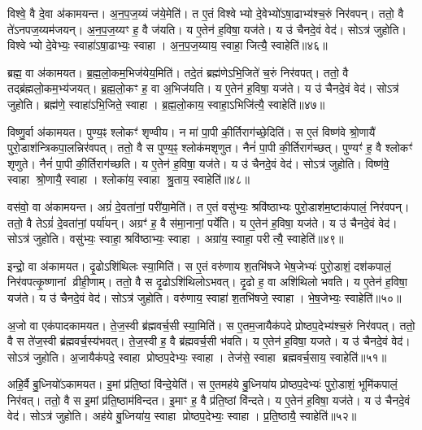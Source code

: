 विश्वे॒ वै दे॒वा अ॑कामयन्त।
अ॒न॒प॒ज॒य्यं ज॑ये॒मेति॑।
त ए॒तं विश्वेभ्यो दे॒वेभ्यो॑\-ऽषा॒ढाभ्य॑श्च॒रुं निर॑वपन्।
ततो॒ वै ते॑\-ऽनपज॒य्यम॑जयन्।
अ॒न॒प॒ज॒य्यꣳ ह॒ वै ज॑यति।
य ए॒तेन॑ ह॒विषा॒ यज॑ते।
य उ॑ चैनदे॒वं वेद॑।
सोऽत्र॑ जुहोति।
विश्वेभ्यो दे॒वेभ्यः॒ स्वाहा॑\-ऽषा॒ढाभ्यः॒ स्वाहा।
अ॒न॒प॒ज॒य्याय॒ स्वाहा॒ जित्यै॒ स्वाहेति॑॥४६॥

ब्रह्म॒ वा अ॑कामयत।
ब्र॒ह्म॒लो॒कम॒भिज॑येय॒मिति॑।
तदे॒तं ब्रह्म॑णे\-ऽभि॒जिते॑ च॒रुं निर॑वपत्।
ततो॒ वै तद्ब्र॑ह्मलो॒कम॒भ्य॑जयत्।
ब्र॒ह्म॒लो॒कꣳ ह॒ वा अ॒भिज॑यति।
य ए॒तेन॑ ह॒विषा॒ यज॑ते।
य उ॑ चैनदे॒वं वेद॑।
सोऽत्र॑ जुहोति।
ब्रह्म॑णे॒ स्वाहा॑\-ऽभि॒जिते॒ स्वाहा।
ब्र॒ह्म॒लो॒काय॒ स्वाहा॒\-ऽभिजि॑त्यै॒ स्वाहेति॑॥४७॥

विष्णु॒र्वा अ॑कामयत।
पुण्य॒ꣴ श्लोकꣳ॑ शृण्वीय।
न मा॑ पा॒पी की॒र्तिराग॑च्छे॒दिति॑।
स ए॒तं विष्ण॑वे श्रो॒णायै॑ पुरो॒डाश॑न्त्रिकपा॒लन्निर॑वपत्।
ततो॒ वै स पुण्य॒ꣴ॒ श्लोक॑मशृणुत।
नैनं॑ पा॒पी की॒र्तिराग॑च्छत्।
पुण्यꣳ॑ ह॒ वै श्लोकꣳ॑ शृणुते।
नैनं॑ पा॒पी की॒र्तिराग॑च्छति।
य ए॒तेन॑ ह॒विषा॒ यज॑ते।
य उ॑ चैनदे॒वं वेद॑।
सोऽत्र॑ जुहोति।
विष्ण॑वे॒ स्वाहा श्रो॒णायै॒ स्वाहा।
श्लोका॑य॒ स्वाहा श्रु॒ताय॒ स्वाहेति॑॥४८॥

वस॑वो॒ वा अ॑कामयन्त।
अग्रं॑ दे॒वता॑नां॒ परी॑या॒मेति॑।
त ए॒तं वसु॑भ्यः॒ श्रवि॑ष्ठाभ्यः पुरो॒डाश॑म॒ष्टाक॑पालं॒ निर॑वपन्।
ततो॒ वै तेऽग्रं॑ दे॒वता॑नां॒ पर्या॑यन्।
अग्रꣳ॑ ह॒ वै स॑मा॒नानां॒ पर्ये॑ति।
य ए॒तेन॑ ह॒विषा॒ यज॑ते।
य उ॑ चैनदे॒वं वेद॑।
सोऽत्र॑ जुहोति।
वसु॑भ्यः॒ स्वाहा॒ श्रवि॑ष्ठाभ्यः॒ स्वाहा।
अग्रा॑य॒ स्वाहा॒ परीत्यै॒ स्वाहेति॑॥४९॥

इन्द्रो॒ वा अ॑कामयत।
दृ॒ढो\-ऽशि॑थिलः स्या॒मिति॑।
स ए॒तं वरु॑णाय श॒तभि॑षजे भेष॒जेभ्यः॑ पुरो॒डाशं॒ दश॑कपालं॒ निर॑वपत्कृ॒ष्णानां व्रीही॒णाम्।
ततो॒ वै स दृ॒ढो\-ऽशि॑थिलो\-ऽभवत्।
दृ॒ढो ह॒ वा अशि॑थिलो भवति।
य ए॒तेन॑ ह॒विषा॒ यज॑ते।
य उ॑ चैनदे॒वं वेद॑।
सोऽत्र॑ जुहोति।
वरु॑णाय॒ स्वाहा॑ श॒तभि॑षजे॒ स्वाहा।
भे॒ष॒जेभ्यः॒ स्वाहेति॑॥५०॥

अ॒जो वा एक॑पादकामयत।
ते॒ज॒स्वी ब्र॑ह्मवर्च॒सी स्या॒मिति॑।
स ए॒तम॒जायैक॑पदे प्रोष्ठप॒देभ्य॑श्च॒रुं निर॑वपत्।
ततो॒ वै स ते॑ज॒स्वी ब्र॑ह्मवर्च॒स्य॑भवत्।
ते॒ज॒स्वी ह॒ वै ब्र॑ह्मवर्च॒सी भ॑वति।
य ए॒तेन॑ ह॒विषा॒ यजते।
य उ॑ चैनदे॒वं वेद॑।
सोऽत्र॑ जुहोति।
अ॒जायैक॑पदे॒ स्वाहा प्रोष्ठप॒देभ्यः॒ स्वाहा।
तेज॑से॒ स्वाहा ब्रह्मवर्च॒साय॒ स्वाहेति॑॥५१॥

अहि॒र्वै बु॒ध्नियो॑\-ऽकामयत।
इ॒मां प्र॑ति॒ष्ठां वि॑न्दे॒येति॑।
स ए॒तमह॑ये बु॒ध्निया॑य प्रोष्ठप॒देभ्यः॑ पुरो॒डाशं॒ भूमि॑कपालं॒ निर॑वत्।
ततो॒ वै स इ॒मां प्र॑ति॒ष्ठाम॑विन्दत।
इ॒माꣳ ह॒ वै प्र॑ति॒ष्ठां वि॑न्दते।
य ए॒तेन॑ ह॒विषा॒ यज॑ते।
य उ॑ चैनदे॒वं वेद॑।
सोऽत्र॑ जुहोति।
अह॑ये बु॒ध्निया॑य॒ स्वाहा प्रोष्ठप॒देभ्यः॒ स्वाहा।
प्र॒ति॒ष्ठायै॒ स्वाहेति॑॥५२॥


